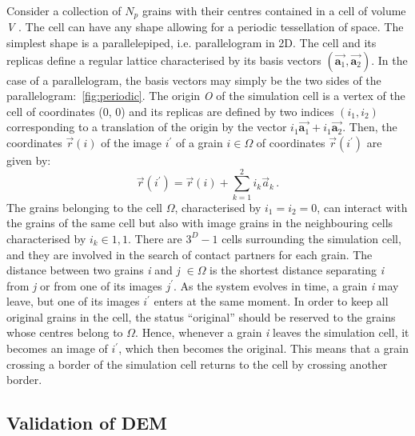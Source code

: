 Consider a collection of $N_{p}$ grains with their centres contained 
in a cell of volume \textit{V} . The cell can have any shape allowing for a 
periodic tessellation of space. The simplest shape is a parallelepiped, i.e. 
parallelogram in 2D. The cell and its replicas define a regular lattice 
characterised by its basis vectors 
$(\overrightarrow{\mathbf{a}_{1}},\overrightarrow{\mathbf{a}_{2}})$. In the 
case of a parallelogram, the basis vectors may simply be the two sides of the 
parallelogram:~\cref{fig:periodic}. The origin \textit{O} of the simulation 
cell is a vertex of the cell of coordinates (0, 0) and its replicas are defined 
by two indices $(i_{1}, i_{2})$ corresponding to a translation of the origin by 
the vector 
$i_{1}\overrightarrow{\mathbf{a}_{1}}+i_{1}\overrightarrow{\mathbf{a}_{2}}$. 
Then, the coordinates $\overrightarrow{r}(\mathit{i})$ of the image 
$\mathit{i}^{\prime}$ of a grain $\mathit{i} \in \Omega$ of coordinates  
$\overrightarrow{r}(\mathit{i}^{\prime})$ are given by:
%
\begin{equation}
\overrightarrow{r}(i^{\prime})=\overrightarrow{r}(i)+\sum\limits_{k=1}^{2}
{\mathit{i}_{\mathit{k}}\overrightarrow{\mathbf{\mathit{a}}}_{\mathit{k}}} \,.
\end{equation}
%
The grains belonging to the cell $\Omega$, characterised by $\mathit{i}_{1} 
= \mathit{i}_{2} = 0$, can interact with the grains of the same cell but also 
with image grains in the neighbouring cells characterised by $\mathit{i}_{k}\in 
{1, 1}$. There are $3^{D} - 1$ cells surrounding the simulation cell, and they 
are involved in the search of contact partners for each grain. The distance 
between two grains \textit{i} and \textit{j} $\in \Omega$ is the shortest 
distance separating \textit{i} from \textit{j} or from one of its images 
$\mathit{j}^{\prime}$. As the system evolves in time, a grain \textit{i} may 
leave, but one of its images $\mathit{i}^{\prime}$ enters at the same moment. 
In order to keep all original grains in the cell, the status ``original'' 
should be reserved to the grains whose centres belong to $\Omega$. Hence, 
whenever a grain \textit{i} leaves the simulation cell, it becomes an image of 
$\mathit{i}^{\prime}$, which then becomes the original. This means that a 
grain crossing a border of the simulation cell returns to the cell by crossing 
another border.


\subsection{Validation of DEM}

